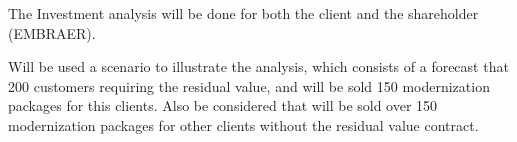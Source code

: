 The Investment analysis will be done for both the client and the shareholder (EMBRAER).

Will be used a scenario to illustrate the analysis, which consists of a forecast that 200 customers requiring the residual value, and  will be sold 150 modernization packages for this clients. Also be considered that will be sold over 150 modernization packages for other clients without the residual value contract.
